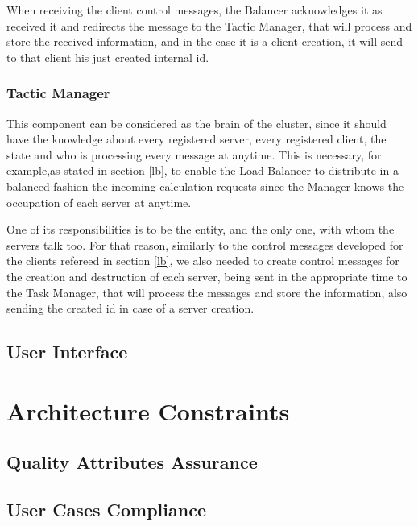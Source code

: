 \documentclass[12pt]{article}
\begin{document}
When receiving the client control messages, the Balancer acknowledges it as received it and redirects the message to the Tactic Manager, that will process and store the received information, and in the case it is a client creation, it will send to that client his just created internal id.

\subsubsection{Tactic Manager}
This component can be considered as the brain of the cluster, since it should have the knowledge about every registered server, every registered client, the state and who is processing every message at anytime. This is necessary, for example,as stated in section \ref{lb}, to enable the Load Balancer to distribute in a balanced fashion the incoming calculation requests since the Manager knows the occupation of each server at anytime.

One of its responsibilities is to be the entity, and the only one, with whom the servers talk too. For that reason, similarly to the control messages developed for the clients refereed in section \ref{lb}, we also needed to create control messages for the creation and destruction of each server, being sent in the appropriate time to the Task Manager, that will process the messages and store the information, also sending the created id in case of a server creation.

\subsection{User Interface} \label{ui} %


\newpage
\section{Architecture Constraints} \label{constraints} %


\subsection{Quality Attributes Assurance} \label{qaa} %


\subsection{User Cases Compliance} \label{compliance} %
\end{document}
